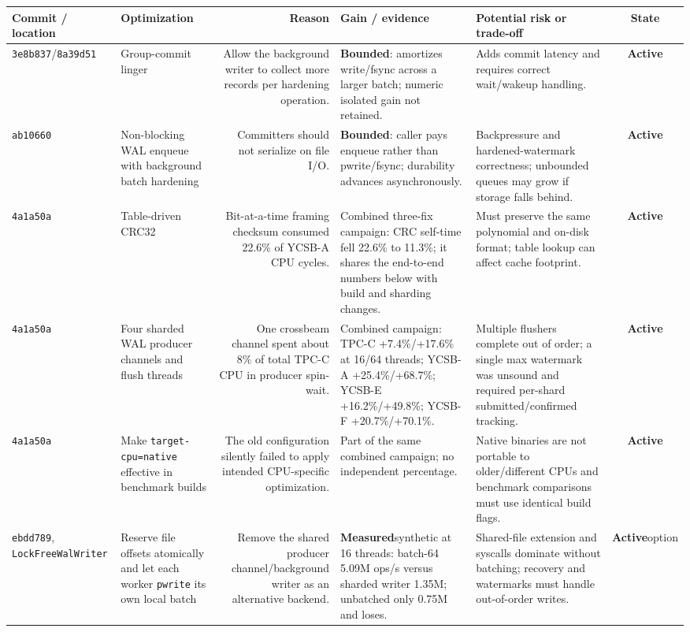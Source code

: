\documentclass[10pt,a4paper,landscape]{article}
\newcommand{\code}[1]{\texttt{#1}}
\newcommand{\commit}[1]{\code{#1}}
\newcommand{\gainmeasured}{\textbf{Measured}}
\newcommand{\gainbounded}{\textbf{Bounded}}
\newcommand{\stateactive}{\textbf{Active}}
\begin{document}
\begin{longtable}{IORGKS}
\toprule
\textbf{Commit / location} & \textbf{Optimization} & \textbf{Reason} &
\textbf{Gain / evidence} & \textbf{Potential risk or trade-off} & \textbf{State} \\
\midrule
\endhead
\commit{3e8b837}/\commit{8a39d51} & Group-commit linger & Allow the background writer to
collect more records per hardening operation. & \gainbounded: amortizes write/fsync across a
larger batch; numeric isolated gain not retained. & Adds commit latency and requires
correct wait/wakeup handling. & \stateactive \\

\commit{ab10660} & Non-blocking WAL enqueue with background batch hardening & Committers
should not serialize on file I/O. & \gainbounded: caller pays enqueue rather than pwrite/fsync;
durability advances asynchronously. & Backpressure and hardened-watermark correctness;
unbounded queues may grow if storage falls behind. & \stateactive \\

\commit{4a1a50a} & Table-driven CRC32 & Bit-at-a-time framing checksum consumed 22.6\% of
YCSB-A CPU cycles. & Combined three-fix campaign: CRC self-time fell 22.6\% to 11.3\%; it
shares the end-to-end numbers below with build and sharding changes. & Must preserve the
same polynomial and on-disk format; table lookup can affect cache footprint. & \stateactive \\

\commit{4a1a50a} & Four sharded WAL producer channels and flush threads & One crossbeam
channel spent about 8\% of total TPC-C CPU in producer spin-wait. & Combined campaign:
TPC-C +7.4\%/+17.6\% at 16/64 threads; YCSB-A +25.4\%/+68.7\%; YCSB-E +16.2\%/+49.8\%;
YCSB-F +20.7\%/+70.1\%. & Multiple flushers complete out of order; a single max watermark
was unsound and required per-shard submitted/confirmed tracking. & \stateactive \\

\commit{4a1a50a} & Make \code{target-cpu=native} effective in benchmark builds & The old
configuration silently failed to apply intended CPU-specific optimization. & Part of the
same combined campaign; no independent percentage. & Native binaries are not portable to
older/different CPUs and benchmark comparisons must use identical build flags. & \stateactive \\

\commit{ebdd789}, \code{LockFreeWalWriter} & Reserve file offsets atomically and let each
worker \code{pwrite} its own local batch & Remove the shared producer channel/background
writer as an alternative backend. & \gainmeasured synthetic at 16 threads: batch-64
5.09M ops/s versus sharded writer 1.35M; unbatched only 0.75M and loses. & Shared-file
extension and syscalls dominate without batching; recovery and watermarks must handle
out-of-order writes. & \stateactive option \\


\end{longtable}
\end{document}
